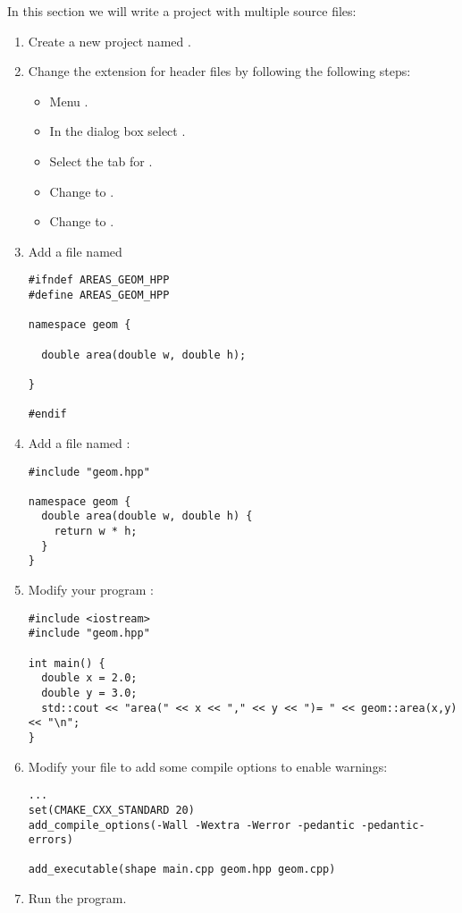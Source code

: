 In this section we will write a project with multiple source files:

\begin{enumerate}

\item
Create a new project named .

\item
Change the extension for header files by following the following steps:
\begin{itemize}
  \item Menu .
  \item In the dialog box select .
  \item Select the tab for .
  \item Change  to .
  \item Change  to .
\end{itemize}

\item
Add a file named 

\begin{lstlisting}
#ifndef AREAS_GEOM_HPP
#define AREAS_GEOM_HPP

namespace geom {

  double area(double w, double h);

}

#endif
\end{lstlisting}

\item 
Add a file named :

\begin{lstlisting}
#include "geom.hpp"

namespace geom {
  double area(double w, double h) {
    return w * h;
  }
}
\end{lstlisting}

\item
Modify your program :

\begin{lstlisting}
#include <iostream>
#include "geom.hpp"

int main() {
  double x = 2.0;
  double y = 3.0;
  std::cout << "area(" << x << "," << y << ")= " << geom::area(x,y) << "\n";
}
\end{lstlisting}

\item
Modify your  file to add some compile options to enable warnings:

\begin{lstlisting}
...
set(CMAKE_CXX_STANDARD 20)
add_compile_options(-Wall -Wextra -Werror -pedantic -pedantic-errors)

add_executable(shape main.cpp geom.hpp geom.cpp)
\end{lstlisting}

\item
Run the program.

\end{enumerate}

